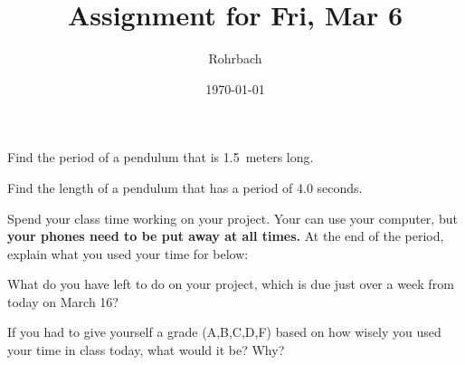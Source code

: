\documentclass[10pt]{exam}
\title{Assignment for Fri, Mar 6}
\author{Rohrbach}
\date{\today}
\begin{document}
\maketitle

\begin{questions}
  


\question Find the period of a pendulum that is 1.5~meters long. \vs

\question Find the length of a pendulum that has a period of 4.0 seconds. \vs




\question Spend your class time working on your project.  Your can use your computer, but \textbf{your phones need to be put away at all times.}  At the end of the period, explain what you used your time for below: \vs

\question What do you have left to do on your project, which is due just over a week from today on March 16? \vs

\question If you had to give yourself a grade (A,B,C,D,F) based on how wisely you used your time in class today, what would it be?  Why? \vs

\end{questions}
\end{document}
